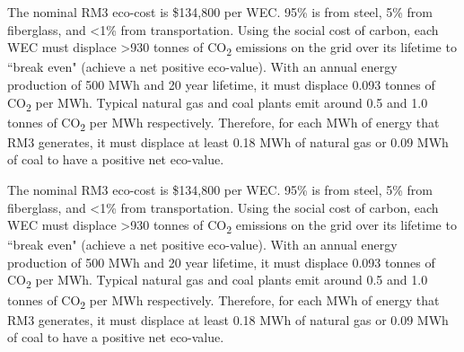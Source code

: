 \newcommand{\ecoCostParagraph}{
    The nominal RM3
    eco-cost is \$134,800 per WEC.
    95\% is from steel, 5\% from fiberglass, and <1\% from transportation.
    Using the social cost of carbon, each WEC must displace >930 tonnes of CO\textsubscript{2} emissions on the grid over its lifetime to ``break even" (achieve a net positive eco-value).
    With an annual energy production of 500 MWh and 20 year lifetime, it must displace 0.093 tonnes of CO\textsubscript{2} per MWh.
    Typical natural gas and coal plants emit around 0.5 and 1.0 tonnes of CO\textsubscript{2} per MWh respectively.
    Therefore, for each MWh of energy that RM3 generates, it must displace at least 0.18 MWh of natural gas or 0.09 MWh of coal to have a positive net eco-value.
}

\ifdefined\DISSERTATION
    \ecoCostTable 
    \ecoCostParagraph
\else
    \begin{minipage}[m]{0.34\textwidth}
        \ecoCostTable
    \end{minipage}
    \hfill
    \begin{minipage}[m]{0.65\textwidth}
        \vspace{.2\baselineskip}
        \setlength{\parindent}{1.5em}
        \ecoCostParagraph
    \end{minipage}
    \vspace{-\baselineskip}
\fi


